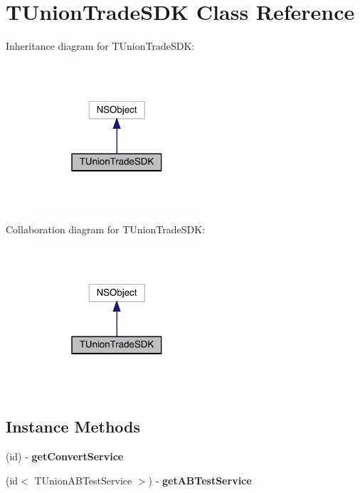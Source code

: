 \hypertarget{interface_t_union_trade_s_d_k}{}\section{T\+Union\+Trade\+S\+DK Class Reference}
\label{interface_t_union_trade_s_d_k}


Inheritance diagram for T\+Union\+Trade\+S\+DK\+:\nopagebreak
\begin{figure}[H]
\begin{center}
\leavevmode
\includegraphics[width=175pt]{interface_t_union_trade_s_d_k__inherit__graph}
\end{center}
\end{figure}


Collaboration diagram for T\+Union\+Trade\+S\+DK\+:\nopagebreak
\begin{figure}[H]
\begin{center}
\leavevmode
\includegraphics[width=175pt]{interface_t_union_trade_s_d_k__coll__graph}
\end{center}
\end{figure}
\subsection*{Instance Methods}
\begin{DoxyCompactItemize}
\item 
\mbox{\label{interface_t_union_trade_s_d_k_a5bbcd9327ce4457f2a4b436ae7a0b99b}} 
(id) -\/ {\bfseries get\+Convert\+Service}
\item 
\mbox{\label{interface_t_union_trade_s_d_k_acd6b18bf3745ee3a9f39e50f4d5c9462}} 
(id$<$ T\+Union\+A\+B\+Test\+Service $>$) -\/ {\bfseries get\+A\+B\+Test\+Service}
\end{DoxyCompactItemize}
